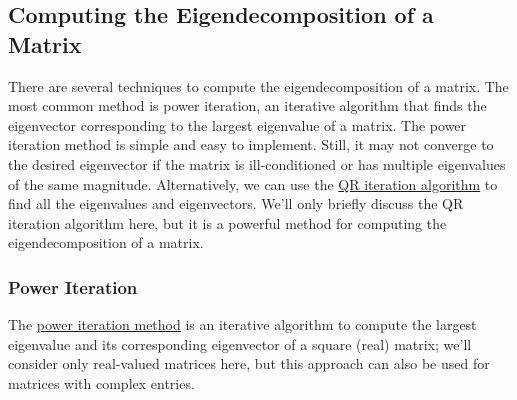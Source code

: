 \documentclass{article}[11pt]
\begin{document}
\subsection{Computing the Eigendecomposition of a Matrix}
There are several techniques to compute the eigendecomposition of a matrix. 
The most common method is power iteration, an iterative algorithm that finds the eigenvector corresponding to the largest eigenvalue of a matrix. The power iteration method is simple and easy to implement. Still, it may not converge to the desired eigenvector if the matrix is ill-conditioned or has multiple eigenvalues of the same magnitude.
Alternatively, we can use the \href{https://en.wikipedia.org/wiki/QR_algorithm}{QR iteration algorithm} to find all the eigenvalues and eigenvectors.
We'll only briefly discuss the QR iteration algorithm here, but it is a powerful method for computing the eigendecomposition of a matrix.

\subsubsection*{Power Iteration}
The \href{https://en.wikipedia.org/wiki/Power_iteration}{power iteration method} 
is an iterative algorithm to compute the largest eigenvalue and its corresponding eigenvector of a square (real) matrix; we'll consider only real-valued matrices here, 
but this approach can also be used for matrices with complex entries. 
\end{document}
